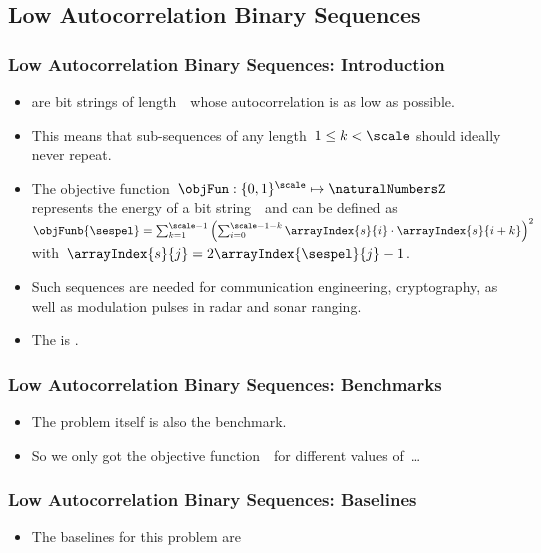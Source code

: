 \documentclass[aspectratio=169,mathserif,notheorems]{beamer}%
\begin{document}
\subsection{Low Autocorrelation Binary Sequences}%
%
\begin{frame}%
\frametitle{Low Autocorrelation Binary Sequences: Introduction}%
\begin{itemize}%
\item {} are bit strings of length~\scale\ whose autocorrelation is as low as possible.%
%
\item<2-> This means that sub-sequences of any length~$1\leq k<\scale$ should ideally never repeat.%
%
\item<3-> The objective function~$\objFun:\{0,1\}^{\scale}\mapsto\naturalNumbersZ$ represents the energy of a bit string~\sespel\ and can be defined as~$\objFunb{\sespel}=\sum_{k=1}^{\scale-1}\left(\sum_{i=0}^{\scale-1-k} \arrayIndex{s}{i} \cdot \arrayIndex{s}{i+k}\right)^2$ with~$\arrayIndex{s}{j}=2\arrayIndex{\sespel}{j}-1$.%
%
\item<4-> Such sequences are needed for communication engineering\cite{MDW2015NESFLLABS,BBB2017LABSOIMFARPTAT}, cryptography\cite{MDW2015NESFLLABS}, as well as modulation pulses in radar and sonar ranging\cite{PM2016LABS}.%
%
\item<5-> The  is \npHard\cite{T2021CNAOTELOTLABSP}.%
%
\end{itemize}%
\end{frame}%
%
\begin{frame}%
\frametitle{Low Autocorrelation Binary Sequences: Benchmarks}%
\begin{itemize}%
\item The problem itself is also the benchmark.%
\item<2-> So we only got the objective function~\objFun\ for different values of~\scale\dots%
\end{itemize}%
\end{frame}%
%
%
\begin{frame}%
\frametitle{Low Autocorrelation Binary Sequences: Baselines}%
\begin{itemize}%
\item The baselines for this problem are%
\end{itemize}%
\end{frame}%
\end{document}
